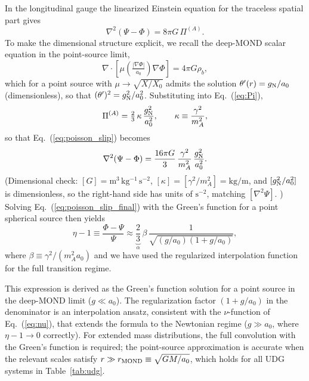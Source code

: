 \documentclass[aps,prd,twocolumn,showpacs,superscriptaddress]{revtex4-2}
\newcommand{\aO}{a_0}
\newcommand{\Xzero}{X_0}
\newcommand{\gN}{g_{\rm N}}
\begin{document}
In the longitudinal gauge the linearized Einstein equation for the
traceless spatial part gives
\begin{equation}
  \nabla^2(\Psi-\Phi) = 8\pi G\,\Pi^{(A)}.
  \label{eq:poisson_slip}
\end{equation}
To make the dimensional structure explicit, we recall the
deep-MOND scalar equation in the point-source limit,
\begin{equation}
  \nabla\cdot\!\left[\mu\!\left(\tfrac{|\nabla\Phi|}{\aO}\right)\nabla\Phi\right]
  = 4\pi G\rho_b,
\end{equation}
which for a point source with $\mu \to \sqrt{X/\Xzero}$ admits the
solution $\theta'(r) = \gN/\aO$ (dimensionless), so that
$(\theta')^2 = \gN^2/\aO^2$. Substituting into Eq.~(\ref{eq:Pi}),
\begin{equation}
  \Pi^{(A)} = \tfrac{2}{3}\,\kappa\,\frac{\gN^2}{\aO^2},
  \qquad \kappa \equiv \frac{\gamma^2}{m_A^2},
\end{equation}
so that Eq.~(\ref{eq:poisson_slip}) becomes
\begin{equation}
  \nabla^2(\Psi-\Phi)
  = \frac{16\pi G}{3}\,\frac{\gamma^2}{m_A^2}\,\frac{\gN^2}{\aO^2}.
  \label{eq:poisson_slip_final}
\end{equation}
(Dimensional check: $[G]=\mathrm{m^3\,kg^{-1}\,s^{-2}}$,
$[\kappa]=[\gamma^2/m_A^2]=\mathrm{kg/m}$, and
$[\gN^2/\aO^2]$ is dimensionless, so the right-hand side has
units of $\mathrm{s^{-2}}$, matching $[\nabla^2\Psi]$. \checkmark)
Solving Eq.~(\ref{eq:poisson_slip_final}) with the Green's function
for a point spherical source then yields
\begin{equation}
  \eta - 1 \equiv \frac{\Phi-\Psi}{\Psi}
  \approx \underbrace{\frac{2}{3}}_{\alpha}\,\beta\,
  \frac{1}{\sqrt{(g/\aO)(1+g/\aO)}},
  \label{eq:eta}
\end{equation}
where $\beta \equiv \gamma^2/(m_A^2\aO)$ and we have used the
regularized interpolation function for the full transition regime.

This expression is derived as the Green's function solution for a
point source in the deep-MOND limit ($g \ll \aO$). The
regularization factor $(1+g/\aO)$ in the denominator is an
interpolation ansatz, consistent with the $\nu$-function of
Eq.~(\ref{eq:nu}), that extends the formula to the Newtonian regime
($g \gg \aO$, where $\eta - 1 \to 0$ correctly). For extended mass
distributions, the full convolution with the Green's function is
required; the point-source approximation is accurate when the
relevant scales satisfy $r \gg r_{\rm MOND} \equiv \sqrt{GM/\aO}$,
which holds for all UDG systems in Table~\ref{tab:udg}.
\end{document}
